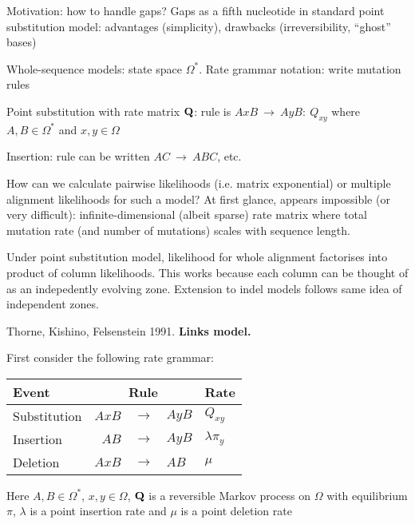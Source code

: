 \documentclass{beamer}
\begin{document}
\begin{frame}{}

\itemb
\item Motivation: how to handle gaps? Gaps as a fifth nucleotide in standard point substitution model: advantages (simplicity), drawbacks (irreversibility, ``ghost'' bases)
\item Whole-sequence models: state space $\Omega^\ast$. Rate grammar notation: write mutation rules
 \itemb
 \item Point substitution with rate matrix ${\bf Q}$: rule is $AxB\ \to\ AyB:\ Q_{xy}$ where $A,B \in \Omega^\ast$ and $x,y \in \Omega$
 \item Insertion: rule can be written $AC\ \to\ ABC$, etc.
 \iteme
\item How can we calculate pairwise likelihoods (i.e. matrix exponential) or multiple alignment likelihoods for such a model?
At first glance, appears impossible (or very difficult): infinite-dimensional (albeit sparse) rate matrix
where total mutation rate (and number of mutations) scales with sequence length.
\item Under point substitution model, likelihood for whole alignment factorises into product of column likelihoods.
This works because each column can be thought of as an indepedently evolving zone. Extension to indel models follows same idea of independent zones.
\iteme
\end{frame}

\begin{frame}{}
\itemb
\item Thorne, Kishino, Felsenstein 1991. {\bf Links model.}
 \itemb
 \item First consider the following rate grammar: \\
\begin{tabular}{l|rll|l}
Event & \multicolumn{3}{c|}{Rule} & Rate \\
\hline
Substitution & $AxB$ & $\to$ & $AyB$ & $Q_{xy}$ \\
Insertion & $AB$ & $\to$ & $AyB$ & $\lambda \pi_y$ \\
Deletion & $AxB$ & $\to$ & $AB$ & $\mu$
\end{tabular}
 \item Here $A,B \in \Omega^\ast$, $x,y \in \Omega$, ${\bf Q}$ is a reversible Markov process on $\Omega$ with equilibrium $\pi$,
$\lambda$ is a point insertion rate and $\mu$ is a point deletion rate
 \iteme
\iteme
\end{frame}
\end{document}

